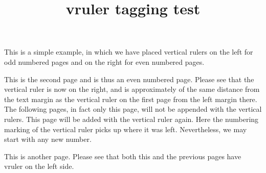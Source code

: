 \documentclass[twoside]{article}
\title{vruler tagging test}
\begin{document}
\advance\textwidth 3cm %
\setvruler [][][][][][\textwidth]
         This is a simple example, in which we have
         placed vertical rulers on the left for
         odd numbered pages and on the right for
         even numbered pages. \newpage

         This is the second page and is thus an even
         numbered page. Please see that the vertical
         ruler is now on the right, and is approximately
         of the same distance from the text margin as
         the vertical ruler on the first page from
         the left margin there. \newpage
\unsetvruler
         The following pages, in fact only this page, will
         not be appended with the vertical rulers.\newpage
\setvruler[][\rulercount]
         This page will be added with the vertical ruler again.
         Here the numbering marking of the vertical ruler picks
         up where it was left. Nevertheless, we may start with
         any new number. \newpage

         This is another page. Please see that both this and
         the previous pages have vruler on the left side.
\end{document}
